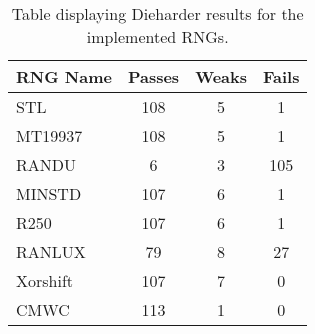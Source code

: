 \begin{table}[tb]
    \caption{Table displaying Dieharder results for the implemented RNGs.}
    \label{tab:speed}
    \begin{center}
        \begin{tabular}{l|ccc}
        \hline
        \hline
\textbf{RNG Name} & \textbf{Passes} & \textbf{Weaks} & \textbf{Fails} \\
        \hline
STL               & 108             & 5              & 1              \\
MT19937           & 108             & 5              & 1              \\
RANDU             & 6               & 3              & 105            \\
MINSTD            & 107             & 6              & 1              \\
R250              & 107             & 6              & 1              \\
RANLUX            & 79              & 8              & 27             \\
Xorshift          & 107             & 7              & 0              \\
CMWC              & 113             & 1              & 0 \\
        \hline
        \hline
        \end{tabular}
    \end{center}
\end{table}
